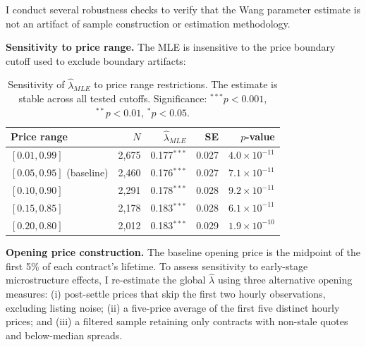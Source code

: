 \documentclass[12pt,a4paper]{article}
\begin{document}
I conduct several robustness checks to verify that the Wang parameter
estimate is not an artifact of sample construction or estimation
methodology.

\textbf{Sensitivity to price range.} The MLE is insensitive to the price
boundary cutoff used to exclude boundary artifacts:

\begin{table}[H]
\centering
\small
\caption{Sensitivity of $\hat{\lambda}_{MLE}$ to price range restrictions. The estimate is stable across all tested cutoffs. Significance: $^{***}p<0.001$, $^{**}p<0.01$, $^{*}p<0.05$.}
\begin{tabular}{lrrrr}
\toprule
Price range & $N$ & $\hat{\lambda}_{MLE}$ & SE & $p$-value \\
\midrule
$[0.01, 0.99]$ & 2,675 & 0.177$^{***}$ & 0.027 & $4.0 \times 10^{-11}$ \\
$[0.05, 0.95]$ (baseline) & 2,460 & 0.176$^{***}$ & 0.027 & $7.1 \times 10^{-11}$ \\
$[0.10, 0.90]$ & 2,291 & 0.178$^{***}$ & 0.028 & $9.2 \times 10^{-11}$ \\
$[0.15, 0.85]$ & 2,178 & 0.183$^{***}$ & 0.028 & $6.1 \times 10^{-11}$ \\
$[0.20, 0.80]$ & 2,012 & 0.183$^{***}$ & 0.029 & $1.9 \times 10^{-10}$ \\
\bottomrule
\end{tabular}
\end{table}

\textbf{Opening price construction.} The baseline opening price is the
midpoint of the first 5\% of each contract's lifetime. To assess
sensitivity to early-stage microstructure effects, I re-estimate the
global \(\hat{\lambda}\) using three alternative opening measures: (i)
post-settle prices that skip the first two hourly observations,
excluding listing noise; (ii) a five-price average of the first five
distinct hourly prices; and (iii) a filtered sample retaining only
contracts with non-stale quotes and below-median spreads.
\end{document}
